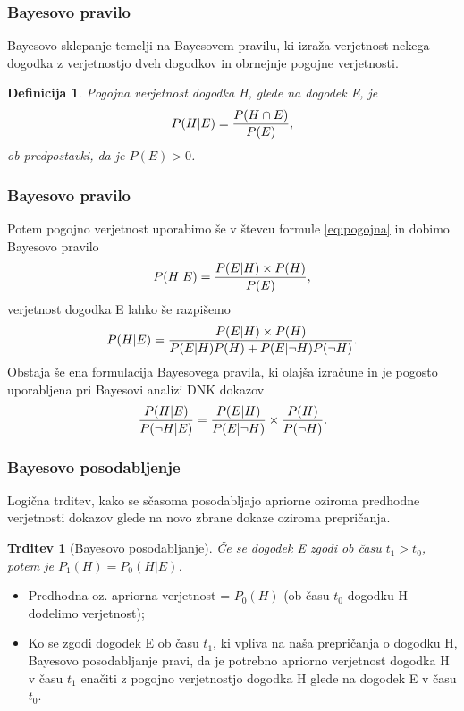 \documentclass{beamer}
\newtheorem{definicija}{Definicija}
\newtheorem{trditev}{Trditev}
\begin{document}
\begin{frame}
    \frametitle{Bayesovo pravilo}
    Bayesovo sklepanje temelji na Bayesovem pravilu, ki izraža verjetnost nekega dogodka z verjetnostjo dveh dogodkov in obrnejnje pogojne
    verjetnosti. \vspace{3mm}
    \begin{definicija}
        Pogojna verjetnost dogodka H, glede na dogodek E, je
        \begin{equation}\label{eq:pogojna}
             P(H \lvert E) = \frac{P(H \cap E)}{P(E)}, \vspace{2mm}
        \end{equation}
        ob predpostavki, da je $P(E) > 0$.
    \end{definicija}
  \end{frame}

\begin{frame}
    \frametitle{Bayesovo pravilo}
    Potem pogojno verjetnost uporabimo še v števcu formule \eqref{eq:pogojna} in dobimo Bayesovo pravilo
    \[
        P(H \lvert E) = \frac{P(E \lvert H) \times P(H)}{P(E)}, \vspace{2mm}
    \]  
    verjetnost dogodka E lahko še razpišemo
    \[
        P(H \lvert E) = \frac{P(E \lvert H) \times P(H)}{P(E \lvert H)P(H) + P(E \lvert \neg H)P(\neg H)}. \vspace{2mm}
    \] 
    Obstaja še ena formulacija Bayesovega pravila, ki olajša izračune in je pogosto uporabljena pri Bayesovi analizi DNK dokazov
    \[
        \frac{P(H \lvert E)}{P(\neg H \lvert E)} = \frac{P(E \lvert H)}{P(E \lvert \neg H)} \times \frac{P(H)}{P(\neg H)}. \vspace{2mm}
    \]
\end{frame}

\begin{frame}
    \frametitle{Bayesovo posodabljenje}
    Logična trditev, kako se sčasoma posodabljajo apriorne oziroma predhodne verjetnosti dokazov glede na novo zbrane dokaze oziroma prepričanja. \vspace{3mm}
    \begin{trditev}[Bayesovo posodabljanje]
        Če se dogodek E zgodi ob času $t_1 > t_0$, potem je $P_1(H) = P_0(H \lvert E)$.
    \end{trditev}
    \begin{itemize}
        \item Predhodna oz. apriorna verjetnost = $P_0(H)$ (ob času $t_0$ dogodku H dodelimo verjetnost);
        \item Ko se zgodi dogodek E ob času $t_1$, ki vpliva na naša prepričanja o dogodku H, Bayesovo posodabljanje pravi, da je potrebno apriorno 
        verjetnost dogodka H v času $t_1$ enačiti z pogojno verjetnostjo dogodka H glede na dogodek E v času $t_0$. 
    \end{itemize}
\end{frame}
\end{document}
